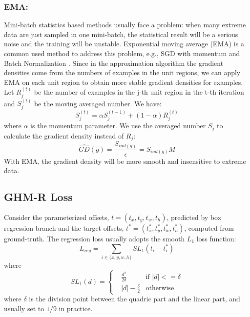 \documentclass[letterpaper]{article} \usepackage{aaai19}  \usepackage{times}  \usepackage{helvet}  \usepackage{courier}  \usepackage{url}  \usepackage{graphicx}  \usepackage{amsmath,amssymb}
\begin{document}
\subsubsection{EMA:} Mini-batch statistics based methods usually face a problem: when many extreme data are just sampled in one mini-batch, the statistical result will be a serious noise and the training will be unstable. Exponential moving average (EMA) is a common used method to address this problem, e.g., SGD with momentum \cite{sgd} and Batch Normalization \cite{bn}. Since in the approximation algorithm the gradient densities come from the numbers of examples in the unit regions, we can apply EMA on each unit region to obtain more stable gradient densities for examples. Let $R_j^{(t)}$ be the number of examples in the j-th unit region in the t-th iteration and $S_j^{(t)}$ be the moving averaged number. We have:
\begin{equation}
   S_j^{(t)} = \alpha S_j^{(t-1)} + (1-\alpha) R_j^{(t)}
\end{equation}
where $\alpha$ is the momentum parameter. We use the averaged number $S_j$ to calculate the gradient density instead of $R_j$:
\begin{equation}
  \hat{GD}(g) = \frac{S_{ind(g)}}{\epsilon} = S_{ind(g)}M
\end{equation}
With EMA, the gradient density will be more smooth and insensitive to extreme data.


\subsection{GHM-R Loss}
Consider the parameterized offsets, $t = (t_x, t_y, t_w, t_h)$, predicted by box regression branch and the target offsets, $t^* = (t_x^*, t_y^*, t_w^*, t_h^*)$, computed from ground-truth. The regression loss usually adopts the smooth $L_1$ loss function:
\begin{equation}
\label{eq:reg1}
    L_{reg} = \sum_{i \in \{x,y,w,h\}}SL_1(t_i - t_i^*)
\end{equation}
where
\begin{equation}
\label{eq:smoothl1}
    SL_1(d) = \left\{ 
    \begin{aligned}
        & \frac{d^2}{2\delta} & \text{if }  |d| <= \delta \\
        & |d| - \frac{\delta}{2} & \text{otherwise}
    \end{aligned}
    \right.
\end{equation}
where $\delta$ is the division point between the quadric part and the linear part, and usually set to $1/9$ in practice. 
\end{document}
